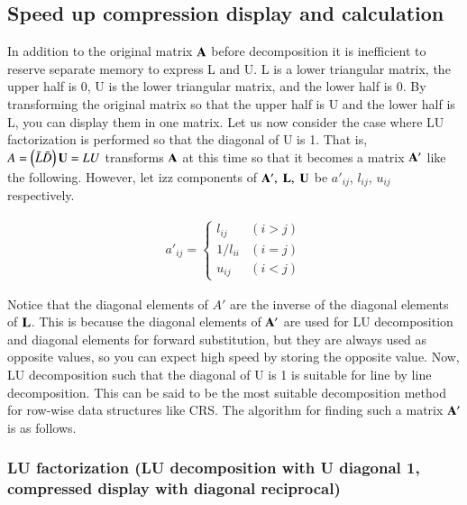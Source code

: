 \subsection{Speed ​​up compression display and calculation}

In addition to the original matrix $\mathbf{A}$ before decomposition it is inefficient to reserve separate memory to express L and U. L is a lower triangular matrix, the upper half is 0, U is the lower triangular matrix, and the lower half is 0. By transforming the original matrix so that the upper half is U and the lower half is L, you can display them in one matrix.
Let us now consider the case where LU factorization is performed so that the diagonal of U is 1. That is, $A=\left(\bar{L}\bar{D}\right)\mathbf{U} = LU$ transforms $\mathbf{A}$ at this time so that it becomes a matrix $\mathbf{A}'$ like the following. However, let izz components of $\mathbf{A}',\;\mathbf{L},\;\mathbf{U}$ be $a'_{ij}$, $l_{ij}$, $u_{ij}$ respectively.

\begin{eqnarray}
a'_{ij} = \left\{\begin{array}{ll}l_{ij} & (i>j)\\ 1/l_{ii} & (i=j) \\ u_{ij} & (i<j)\end{array}\right.
\end{eqnarray}

Notice that the diagonal elements of $A'$ are the inverse of the diagonal elements of $\mathbf{L}$. This is because the diagonal elements of $\mathbf{A}'$ are used for LU decomposition and diagonal elements for forward substitution, but they are always used as opposite values, so you can expect high speed by storing the opposite value. Now, LU decomposition such that the diagonal of U is 1 is suitable for line by line decomposition. This can be said to be the most suitable decomposition method for row-wise data structures like CRS. The algorithm for finding such a matrix $\mathbf{A}'$ is as follows.

\subsubsection{LU factorization (LU decomposition with U diagonal 1, compressed display with diagonal reciprocal)}

